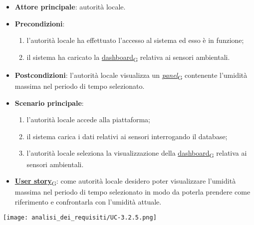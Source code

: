 \newpage
{}
\begin{itemize}
	\item \textbf{Attore principale}: autorità locale.
	\item \textbf{Precondizioni}:
	      \begin{enumerate}
		      \item l'autorità locale ha effettuato l'accesso al sistema ed esso è in funzione;
		      \item il sistema ha caricato la \href{https://7last.github.io/docs/pb/documentazione-interna/glossario\#dashboard}{dashboard\textsubscript{G}} relativa ai sensori ambientali.
	      \end{enumerate}
	\item \textbf{Postcondizioni}: l'autorità locale visualizza un \href{https://7last.github.io/docs/pb/documentazione-interna/glossario\#panel}{\textit{panel}\textsubscript{G}} contenente l'umidità massima nel periodo di tempo selezionato.
	\item \textbf{Scenario principale}:
	      \begin{enumerate}
		      \item l'autorità locale accede alla piattaforma;
		      \item il sistema carica i dati relativi ai sensori interrogando il database;
		      \item l'autorità locale seleziona la visualizzazione della \href{https://7last.github.io/docs/pb/documentazione-interna/glossario\#dashboard}{dashboard\textsubscript{G}} relativa ai sensori ambientali.
	      \end{enumerate}
	\item \href{https://7last.github.io/docs/pb/documentazione-interna/glossario\#user-story}{\textbf{User story}\textsubscript{G}}:
	      come autorità locale desidero poter visualizzare l'umidità massima nel periodo di tempo selezionato
	      in modo da poterla prendere come riferimento e confrontarla con l'umidità attuale.
\end{itemize}
\begin{center}
	\texttt{[image: analisi\_dei\_requisiti/UC-3.2.5.png]}
\end{center}

